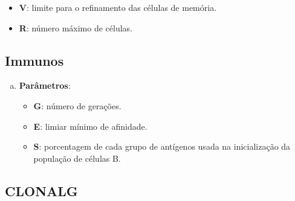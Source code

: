 \begin{enumerate}[a)]
\begin{itemize}

        \item \textbf{V}: limite para o refinamento das células de memória.

        \item \textbf{R}: número máximo de células.
        \end{itemize}
\end{enumerate}

\subsection{Immunos}

\begin{enumerate}[a)]
    \item \textbf{Parâmetros}:
        \begin{itemize}

            \item \textbf{G}: número de gerações.

            \item \textbf{E}: limiar mínimo de afinidade.

            \item \textbf{S}: porcentagem de cada grupo de antígenos usada na inicialização da população de células B.
        \end{itemize}
\end{enumerate}

\subsection{CLONALG}

